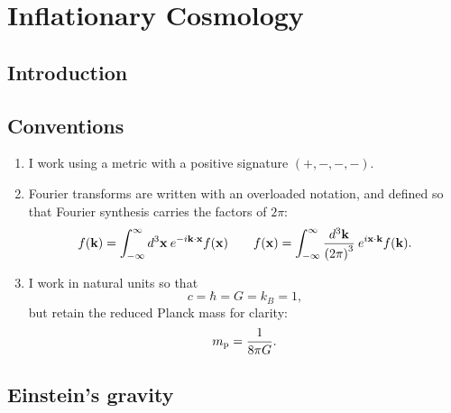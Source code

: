 \chapter{Inflationary Cosmology}
\label{chap:cos}

\section{Introduction}
\label{sec:cos:intro}

\section{Conventions}
\label{sec:cos:conventions}


\begin{enumerate}
  \item I work using a metric with a positive signature $(+,-,-,-)$.
  \item Fourier transforms are written with an overloaded notation, and defined so that Fourier synthesis carries the factors of $2\pi$:
    \begin{equation}
      f(\mathbf{k}) = \int_{-\infty}^{\infty} d^3\mathbf{x}\: e^{-i \mathbf{k}\cdot\mathbf{x}} f(\mathbf{x}) \qquad f(\mathbf{x}) = \int_{-\infty}^{\infty} \frac{d^3\mathbf{k}}{{(2\pi)}^3}\: e^{i \mathbf{x}\cdot\mathbf{k}} f(\mathbf{k}).
      \label{eqn:cos:fourier_transform}
    \end{equation}
  \item I work in natural units so that 
    \begin{equation}
      c = \hbar = G = k_B = 1,
      \label{eqn:cos:natural_units}
    \end{equation}
    but retain the reduced Planck mass for clarity:
    \begin{equation}
      m_{\mathrm{p}} = \frac{1}{8\pi G}.
      \label{eqn:cos:reduced_planck_mass}
    \end{equation}
    
\end{enumerate}


\section{Einstein's gravity}
\label{sec:cos:einsteins_gravity}

